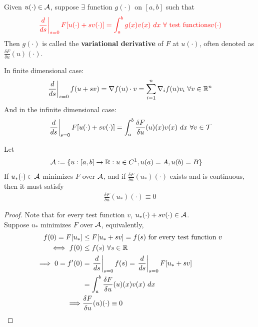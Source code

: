 \documentclass{article}
\begin{document}
	\begin{definition}
		Given $u(\cdot) \in \mathcal{{A}}$, suppose $\exists$ function $g(\cdot)$ on $[a, b]$ such that 
		\begin{align}
			\textcolor{red}{\left. \frac{d}{ds} \right |_{s=0} F[u(\cdot) + sv(\cdot)] = \int_a^b g(x) v(x)\ dx\ \forall \text{{ test functions}} v(\cdot)}
		\end{align}
		Then $g(\cdot)$ is called the \textbf{variational derivative} of $F$ at $u(\cdot)$, often denoted as $\frac{\delta F}{\delta u}(u)(\cdot)$.
	\end{definition}
	
	\begin{remark}
		In finite dimensional case:
		\begin{align}
			\left. \frac{d}{ds} \right |_{s=0} f(u + sv) = \nabla f(u) \cdot v = \sum_{i=1}^n \nabla_i f(u) v_i\ \forall v \in \mathbb{R}^n
		\end{align}
		And in the infinite dimensional case:
		\begin{align}
			\left. \frac{d}{ds} \right |_{s=0} F[u(\cdot) + s v(\cdot)] = \int_a^b \frac{\delta F}{\delta u}(u)(x) v(x)\ dx\ \forall v \in \mathcal{{T}}
		\end{align}
	\end{remark}
	
	\begin{lemma}
		Let 
		\begin{align}
			\mathcal{{A}} &:=\{u:[a, b] \to \mathbb{R}:u \in C^1, u(a) = A, u(b) = B\}
		\end{align}
		If $u_*(\cdot) \in \mathcal{{A}}$ minimizes $F$ over $\mathcal{{A}}$, and if $\frac{\delta F}{\delta u}(u_*)(\cdot)$ exists and is continuous, then it must satisfy
		\begin{align}
			\frac{\delta F}{\delta u}(u_*)(\cdot) \equiv 0
		\end{align}
	\end{lemma}
	
	\begin{proof}
		Note that for every test function $v$, $u_*(\cdot) + s v(\cdot) \in \mathcal{{A}}$. \\
		Suppose $u_*$ minimizes $F$ over $\mathcal{{A}}$, equivalently,
		\begin{align}
			f(0) = F[u_*] &\leq F[u_* + sv] = f(s) \text{{ for every test function $v$}} \\
			\iff f(0) &\leq f(s)\ \forall s \in \mathbb{R} \\
			\implies 0 = f'(0) 
			&= \left. \frac{d}{ds} \right |_{s=0} f(s)
			= \left. \frac{d}{ds} \right |_{s=0} F[u_* + sv] \\
			&= \int_a^b \frac{\delta F}{\delta u}(u)(x)v(x)\ dx \\
			\implies &\frac{\delta F}{\delta u}(u)(\cdot) \equiv 0
		\end{align}
	\end{proof}
	
\end{document}
